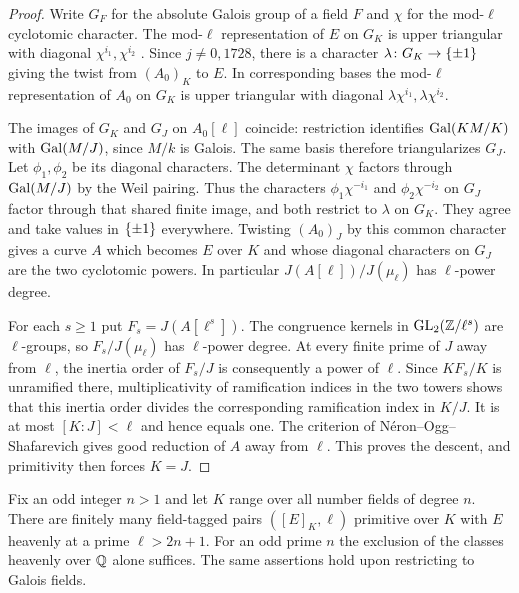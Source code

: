 \begin{proof}
\sloppy
Write $G_F$ for the absolute Galois group of a field $F$ and $\chi$ for the mod-$\ell$
cyclotomic character. The mod-$\ell$ representation of $E$ on $G_K$ is upper
triangular with diagonal $\chi^{i_1},\chi^{i_2}$
\cite[Proposition~2.4]{OHara2026Heavenly}. Since $j\ne0,1728$, there is a character
$\lambda\colon G_K\to\{\pm1\}$ giving the twist from $(A_0)_K$ to $E$. In
corresponding bases the mod-$\ell$ representation of $A_0$ on $G_K$ is upper
triangular with diagonal $\lambda\chi^{i_1},\lambda\chi^{i_2}$.

The images of $G_K$ and $G_J$ on $A_0[\ell]$ coincide: restriction identifies
$\operatorname{Gal}(KM/K)$ with $\operatorname{Gal}(M/J)$, since $M/k$ is Galois. The same basis therefore
triangularizes $G_J$. Let $\phi_1,\phi_2$ be its diagonal characters. The determinant
$\chi$ factors through $\operatorname{Gal}(M/J)$ by the Weil pairing. Thus the characters
$\phi_1\chi^{-i_1}$ and $\phi_2\chi^{-i_2}$ on $G_J$ factor through that shared finite
image, and both restrict to $\lambda$ on $G_K$. They agree and take values in
$\{\pm1\}$ everywhere. Twisting $(A_0)_J$ by this common character gives a curve $A$
which becomes $E$ over $K$ and whose diagonal characters on $G_J$ are the two
cyclotomic powers. In particular $J(A[\ell])/J(\mu_\ell)$ has $\ell$-power degree.

For each $s\ge1$ put $F_s=J(A[\ell^s])$. The congruence kernels in
$\operatorname{GL}_2(\mathbb{Z}/\ell^s)$ are $\ell$-groups, so $F_s/J(\mu_\ell)$ has $\ell$-power degree. At
every finite prime of $J$ away from $\ell$, the inertia order of $F_s/J$ is
consequently a power of $\ell$. Since $KF_s/K$ is unramified there, multiplicativity of
ramification indices in the two towers shows that this inertia order divides the
corresponding ramification index in $K/J$. It is at most $[K:J]<\ell$ and hence equals
one. The criterion of N\'eron--Ogg--Shafarevich gives good reduction of $A$ away from
$\ell$. This proves the descent, and primitivity then forces $K=J$.
\end{proof}

\begin{theorem}\label{dir:thm:heavenlyodd}
Fix an odd integer $n>1$ and let $K$ range over all number fields of degree $n$. There
are finitely many field-tagged pairs $([E]_K,\ell)$ primitive over $K$ with $E$
heavenly at a prime $\ell>2n+1$. For an odd prime $n$ the exclusion of the classes
heavenly over $\mathbb{Q}$ alone suffices. The same assertions hold upon restricting to Galois
fields.
\end{theorem}

